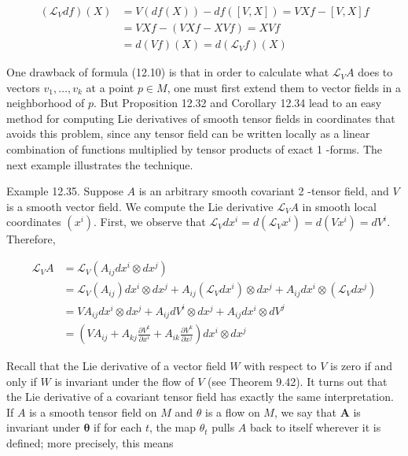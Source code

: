 \documentclass[10pt, letterpaper]{article}
\begin{document}
$$
\begin{aligned}
\left(\mathscr{L}_{V} d f\right)(X) & =V(d f(X))-d f([V, X])=V X f-[V, X] f \\
& =V X f-(V X f-X V f)=X V f \\
& =d(V f)(X)=d\left(\mathscr{L}_{V} f\right)(X)
\end{aligned}
$$

One drawback of formula (12.10) is that in order to calculate what $\mathscr{L}_{V} A$ does to vectors $v_{1}, \ldots, v_{k}$ at a point $p \in M$, one must first extend them to vector fields in a neighborhood of $p$. But Proposition 12.32 and Corollary 12.34 lead to an easy method for computing Lie derivatives of smooth tensor fields in coordinates that avoids this problem, since any tensor field can be written locally as a linear combination of functions multiplied by tensor products of exact 1 -forms. The next example illustrates the technique.

Example 12.35. Suppose $A$ is an arbitrary smooth covariant 2 -tensor field, and $V$ is a smooth vector field. We compute the Lie derivative $\mathscr{L}_{V} A$ in smooth local coordinates $\left(x^{i}\right)$. First, we observe that $\mathscr{L}_{V} d x^{i}=d\left(\mathscr{L}_{V} x^{i}\right)=d\left(V x^{i}\right)=d V^{i}$. Therefore,

$$
\begin{aligned}
\mathscr{L}_{V} A & =\mathscr{L}_{V}\left(A_{i j} d x^{i} \otimes d x^{j}\right) \\
& =\mathscr{L}_{V}\left(A_{i j}\right) d x^{i} \otimes d x^{j}+A_{i j}\left(\mathscr{L}_{V} d x^{i}\right) \otimes d x^{j}+A_{i j} d x^{i} \otimes\left(\mathscr{L}_{V} d x^{j}\right) \\
& =V A_{i j} d x^{i} \otimes d x^{j}+A_{i j} d V^{i} \otimes d x^{j}+A_{i j} d x^{i} \otimes d V^{j} \\
& =\left(V A_{i j}+A_{k j} \frac{\partial V^{k}}{\partial x^{i}}+A_{i k} \frac{\partial V^{k}}{\partial x^{j}}\right) d x^{i} \otimes d x^{j}
\end{aligned}
$$

Recall that the Lie derivative of a vector field $W$ with respect to $V$ is zero if and only if $W$ is invariant under the flow of $V$ (see Theorem 9.42). It turns out that the Lie derivative of a covariant tensor field has exactly the same interpretation. If $A$ is a smooth tensor field on $M$ and $\theta$ is a flow on $M$, we say that $\boldsymbol{A}$ is invariant under $\boldsymbol{\theta}$ if for each $t$, the map $\theta_{t}$ pulls $A$ back to itself wherever it is defined; more precisely, this means
\end{document}
